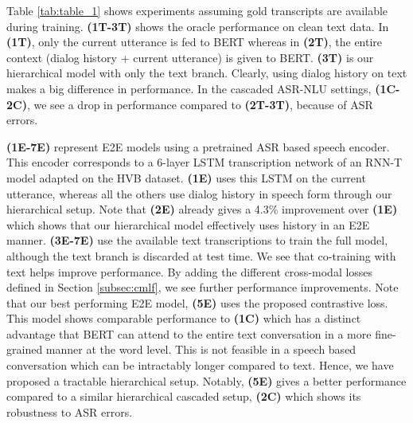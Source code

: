 \documentclass{article}
\begin{document}
\begin{table}
    \centering
    \caption{Performances when gold transcripts are unavailable (except \textbf{(10E)}). In \textbf{(C)}, we use an off-the-shelf ASR. In \textbf{(E)}, the speech encoder is from an off-the-shelf RNN-T ASR.}
    \label{tab:table_2}
\end{table}


Table \ref{tab:table_1} shows experiments assuming gold transcripts are available during training. \textbf{(1T-3T)} shows the oracle performance on clean text data. In \textbf{(1T)}, only the current utterance is fed to BERT whereas in \textbf{(2T)}, the entire context (dialog history + current utterance) is given to BERT. \textbf{(3T)} is our hierarchical model with only the text branch. Clearly, using dialog history on text makes a big difference in performance. In the cascaded ASR-NLU settings, \textbf{(1C-2C)}, we see a drop in performance compared to \textbf{(2T-3T)}, because of ASR errors.

\textbf{(1E-7E)} represent E2E models using a pretrained ASR based speech encoder. This encoder corresponds to a 6-layer LSTM transcription network of an RNN-T model adapted on the HVB dataset. \textbf{(1E)} uses this LSTM on the current utterance, whereas all the others use dialog history in speech form through our hierarchical setup. Note that \textbf{(2E)} already gives a 4.3\% improvement over \textbf{(1E)} which shows that our hierarchical model effectively uses history in an E2E manner. \textbf{(3E-7E)} use the available text transcriptions to train the full model, although the text branch is discarded at test time. We see that co-training with text helps improve performance. By adding the different cross-modal losses defined in Section \ref{subsec:cmlf}, we see further performance improvements. Note that our best performing E2E model, \textbf{(5E)} uses the proposed contrastive loss. This model shows comparable performance to \textbf{(1C)} which has a distinct advantage that BERT can attend to the entire text conversation in a more fine-grained manner at the word level. This is not feasible in a speech based conversation which can be intractably longer compared to text. Hence, we have proposed a tractable hierarchical setup. Notably, \textbf{(5E)} gives a better performance compared to a similar hierarchical cascaded setup, \textbf{(2C)} which shows its robustness to ASR errors.
\end{document}
